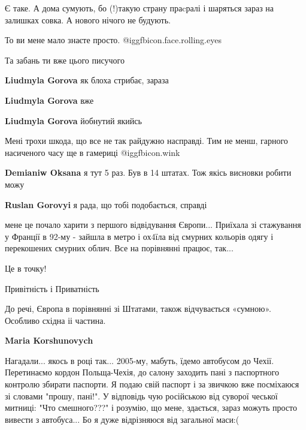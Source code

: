 \begin{itemize}
Є таке.
А дома сумують, бо (!)такую страну праcралі і шаряться зараз на залишках совка. А нового нічого не будують.

То ви мене мало знаєте просто.  @igg{fbicon.face.rolling.eyes} 

Та забань ти вже цього писучого

\begin{itemize} %
\textbf{Liudmyla Gorova} як блоха стрибає, зараза

\textbf{Liudmyla Gorova} вже

\textbf{Liudmyla Gorova} йобнутий якийсь
\end{itemize} %


Мені трохи шкода, що все не так райдужно насправді.
Тим не менш, гарного насиченого часу ще в гамериці @igg{fbicon.wink} 

\begin{itemize} %
\textbf{Demianiw Oksana} я тут 5 раз. Був в 14 штатах. Тож якісь висновки робити можу

\textbf{Ruslan Gorovyi} я рада, що тобі подобається, справді
\end{itemize} %


мене це почало харити з першого відвідування Європи... Приїхала зі стажування у
Франції в 92-му - зайшла в метро і ох4їла від смурних кольорів одягу і
перекошених смурних облич. Все на порівнянні працює, так...


Це в точку!

Привітність і Приватність

До речі, Європа в порівнянні зі Штатами, також відчувається «сумною». Особливо східна іі частина.

\begin{itemize} %
\textbf{Maria Korshunovych} 

Нагадали... якось в році так... 2005-му, мабуть, їдемо автобусом до Чехії.
Перетинаємо кордон Польща-Чехія, до салону заходить пані з паспортного контролю
збирати паспорти. Я подаю свій паспорт і за звичкою вже посміхаюся зі словами
"прошу, пані!". У відповідь чую російською від суворої чеської митниці: "Что
смешного???" і розумію, що мене, здається, зараз можуть просто вивести з
автобуса... Бо я дуже відрізняюся від загальної маси:(



\end{itemize}
\end{itemize}
